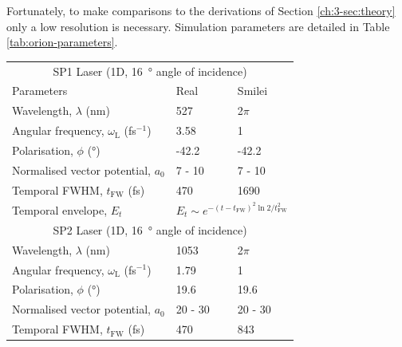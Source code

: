 Fortunately, to make comparisons to the derivations of Section \ref{ch:3-sec:theory} only a low resolution is necessary. Simulation parameters are detailed in Table \ref{tab:orion-parameters}. 
\begin{table}[]
	\begin{center}
		\begin{tabular}{lll}
			\hline \hline
			\multicolumn{3}{c}{SP1 Laser (1D, \qty{16}{\degree} angle of incidence)}   \\
			Parameters                                        & Real                                 & Smilei                         \\ \hline
			Wavelength, $\lambda$ (nm)                        & 527                                 & 2$\pi$                      \\
			Angular frequency, $\omega_\mathrm{L}$ (fs$^{-1}$)         & 3.58                                  & 1                           \\
			Polarisation, $\phi$ (\unit{\degree})        & -42.2                                 &    -42.2                         \\
			Normalised vector potential, $a_0$     & 7 - 10                               &    7 - 10                           \\
			Temporal FWHM, $t_\mathrm{FW}$ (fs)       & 470                                 &      1690                    \\
			Temporal envelope, $E_t$                          & \multicolumn{2}{l}{$E_t \sim e^{-(t-t_\mathrm{FW})^2\ln 2 /t_\mathrm{FW}^2}$} \vspace{0.15cm}\\ \hline \hline
			\multicolumn{3}{c}{SP2 Laser (1D, \qty{16}{\degree} angle of incidence)}      \\ \hline
			Wavelength, $\lambda$ (nm)                        & 1053                                 & 2$\pi$                      \\
			Angular frequency, $\omega_\mathrm{L}$ (fs$^{-1}$)         & 1.79                                  & 1                           \\
			Polarisation, $\phi$ (\unit{\degree})          &        19.6                           &     19.6                        \\
			Normalised vector potential, $a_0$     & 20 - 30                               &    20 - 30                        \\
			Temporal FWHM, $t_\mathrm{FW}$ (fs)       & 470                                 &      843                    \\

\end{tabular}
\end{center}
\end{table}
